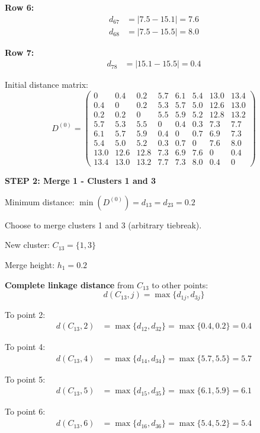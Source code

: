 \documentclass[12pt]{article}
\begin{document}
\begin{solution}
\textbf{Row 6:}
\begin{align*}
d_{67} &= |7.5 - 15.1| = 7.6 \\
d_{68} &= |7.5 - 15.5| = 8.0
\end{align*}

\textbf{Row 7:}
\begin{align*}
d_{78} &= |15.1 - 15.5| = 0.4
\end{align*}

Initial distance matrix:
\[
D^{(0)} = \begin{pmatrix}
0 & 0.4 & 0.2 & 5.7 & 6.1 & 5.4 & 13.0 & 13.4 \\
0.4 & 0 & 0.2 & 5.3 & 5.7 & 5.0 & 12.6 & 13.0 \\
0.2 & 0.2 & 0 & 5.5 & 5.9 & 5.2 & 12.8 & 13.2 \\
5.7 & 5.3 & 5.5 & 0 & 0.4 & 0.3 & 7.3 & 7.7 \\
6.1 & 5.7 & 5.9 & 0.4 & 0 & 0.7 & 6.9 & 7.3 \\
5.4 & 5.0 & 5.2 & 0.3 & 0.7 & 0 & 7.6 & 8.0 \\
13.0 & 12.6 & 12.8 & 7.3 & 6.9 & 7.6 & 0 & 0.4 \\
13.4 & 13.0 & 13.2 & 7.7 & 7.3 & 8.0 & 0.4 & 0
\end{pmatrix}
\]

\textbf{STEP 2: Merge 1 - Clusters 1 and 3}

Minimum distance: $\min(D^{(0)}) = d_{13} = d_{23} = 0.2$

Choose to merge clusters 1 and 3 (arbitrary tiebreak).

New cluster: $C_{13} = \{1, 3\}$

Merge height: $h_1 = 0.2$

\textbf{Complete linkage distance} from $C_{13}$ to other points:
\[
d(C_{13}, j) = \max\{d_{1j}, d_{3j}\}
\]

To point 2:
\begin{align*}
d(C_{13}, 2) &= \max\{d_{12}, d_{32}\} = \max\{0.4, 0.2\} = 0.4
\end{align*}

To point 4:
\begin{align*}
d(C_{13}, 4) &= \max\{d_{14}, d_{34}\} = \max\{5.7, 5.5\} = 5.7
\end{align*}

To point 5:
\begin{align*}
d(C_{13}, 5) &= \max\{d_{15}, d_{35}\} = \max\{6.1, 5.9\} = 6.1
\end{align*}

To point 6:
\begin{align*}
d(C_{13}, 6) &= \max\{d_{16}, d_{36}\} = \max\{5.4, 5.2\} = 5.4
\end{align*}


\end{solution}
\end{document}
